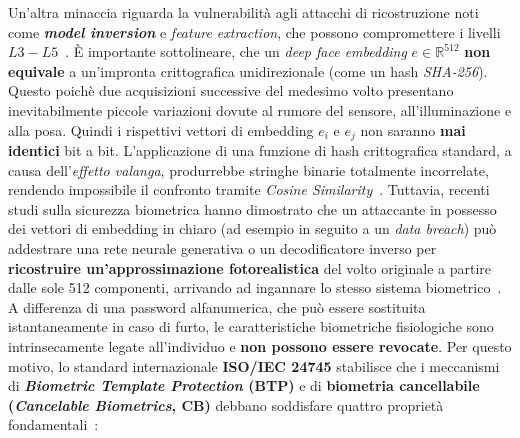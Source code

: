 Un'altra minaccia riguarda la vulnerabilità agli attacchi di ricostruzione noti come \textbf{\textit{model inversion}} e \textit{feature extraction}, che possono compromettere i livelli $L3-L5$~\cite{otroshishahrezaBenchmarkingCancelableBiometrics2022,sanzGoverningPrivacyPreservingFace2026}.
È importante sottolineare, che un \textit{deep face embedding} $e \in \mathbb{R}^{512}$ \textbf{non equivale} a un'impronta crittografica unidirezionale (come un hash \textit{SHA-256}). 
Questo poichè due acquisizioni successive del medesimo volto presentano inevitabilmente piccole variazioni dovute al rumore del sensore, all'illuminazione e alla posa. Quindi i rispettivi vettori di embedding $e_i$ e $e_j$ non saranno \textbf{mai identici} bit a bit.
L'applicazione di una funzione di hash crittografica standard, a causa dell'\textit{effetto valanga}, produrrebbe stringhe binarie totalmente incorrelate, rendendo impossibile il confronto tramite \textit{Cosine Similarity}~\cite{otroshishahrezaBenchmarkingCancelableBiometrics2022}.
Tuttavia, recenti studi sulla sicurezza biometrica hanno dimostrato che un attaccante in possesso dei vettori di embedding in chiaro (ad esempio in seguito a un \textit{data breach}) può addestrare una rete neurale generativa o un decodificatore inverso per \textbf{ricostruire un'approssimazione fotorealistica} del volto originale a partire dalle sole 512 componenti, arrivando ad ingannare lo stesso sistema biometrico~\cite{otroshishahrezaBenchmarkingCancelableBiometrics2022}.
A differenza di una password alfanumerica, che può essere sostituita istantaneamente in caso di furto, le caratteristiche biometriche fisiologiche sono intrinsecamente legate all'individuo e \textbf{non possono essere revocate}.
Per questo motivo, lo standard internazionale \textbf{ISO/IEC 24745} stabilisce che i meccanismi di \textbf{\textit{Biometric Template Protection} (BTP)} e di \textbf{biometria cancellabile (\textit{Cancelable Biometrics}, CB)} debbano soddisfare quattro proprietà fondamentali~\cite{otroshishahrezaBenchmarkingCancelableBiometrics2022}:
